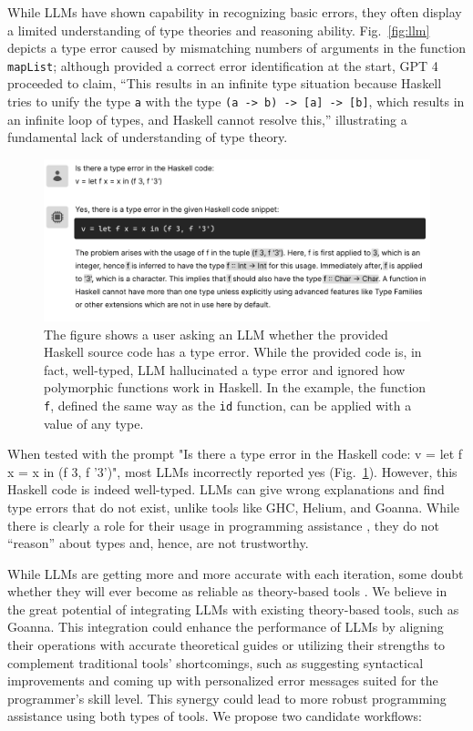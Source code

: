 \documentclass[pdflatex,lineno,sn-nature,Numbered]{sn-jnl}%
\begin{document}
While LLMs have shown capability in recognizing basic errors, they often display a limited understanding of type theories and reasoning ability. Fig.~\ref{fig:llm} depicts a type error caused by mismatching numbers of arguments in the function \texttt{mapList}; although provided a correct error identification at the start, GPT 4 proceeded to claim, “This results in an infinite type situation because Haskell tries to unify the type \texttt{a} with the type \texttt{(a -> b) -> [a] -> [b]}, which results in an infinite loop of types, and Haskell cannot resolve this,” illustrating a fundamental lack of understanding of type theory.

\begin{figure}[hbt]
  \includegraphics[width=\linewidth]{images/LLM2.pdf}
  \caption[An example where LLM identified a type error in well-typed source code]{\label{fig:llm2}
  The figure shows a user asking an LLM whether the provided Haskell source code has a type error. While the provided code is, in fact, well-typed, LLM hallucinated a type error and ignored how polymorphic functions work in Haskell. In the example, the function \texttt{f},  defined the same way as the \texttt{id} function, can be applied with a value of any type.
    } 
\end{figure}

When tested with the prompt "Is there a type error in the Haskell code: v = let f x = x in (f 3, f '3')", most LLMs incorrectly reported yes (Fig.~\ref{fig:llm2}). However, this Haskell code is indeed well-typed. LLMs can give wrong explanations and find type errors that do not exist, unlike tools like GHC, Helium, and Goanna. While there is clearly a role for their usage in programming assistance \cite{Lee2024-hs}, they do not “reason” about types and, hence, are not trustworthy.

While LLMs are getting more and more accurate with each iteration, some doubt whether they will ever become as reliable as theory-based tools \cite{Berglund2023-ig}. We believe in the great potential of integrating LLMs with existing theory-based tools, such as Goanna. This integration could enhance the performance of LLMs by aligning their operations with accurate theoretical guides or utilizing their strengths to complement traditional tools' shortcomings, such as suggesting syntactical improvements and coming up with personalized error messages suited for the programmer's skill level. This synergy could lead to more robust programming assistance using both types of tools. We propose two candidate workflows:
\end{document}
